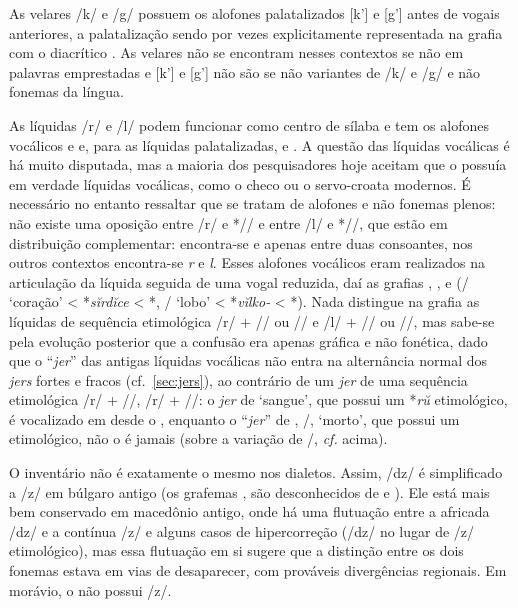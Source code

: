 As velares /k/ e /g/ possuem os alofones palatalizados [k'] e [g'] antes de
vogais anteriores, a palatalização sendo por vezes explicitamente representada na
grafia com o diacrítico .
As velares não se encontram nesses contextos se não em palavras emprestadas e
	[k'] e [g'] não são se não variantes de /k/ e /g/ e não fonemas da língua.

As líquidas /r/ e /l/ podem funcionar como centro de sílaba e tem os alofones
vocálicos  e  e, para as líquidas palatalizadas,
 e .
A questão das líquidas vocálicas é há muito disputada, mas a maioria dos
pesquisadores hoje aceitam que o  possuía em verdade líquidas
vocálicas, como o checo ou o servo-croata modernos.
É necessário no entanto ressaltar que se tratam de alofones e não fonemas plenos:
não existe uma oposição entre /r/ e */\emph{}/ e entre /l/ e
*/\emph{}/, que estão em distribuição complementar: encontra-se
 e  apenas entre duas consoantes, nos outros contextos
encontra-se \emph{r} e \emph{l}.
Esses alofones vocálicos eram realizados na articulação da líquida seguida de
uma vogal reduzida, daí as grafias , ,
 e  (\slash{}
`coração' <  *\emph{sĭrdĭce} < *,
\slash{} `lobo' <  *\emph{vĭlko-}
< *).
Nada distingue na grafia as líquidas de sequência etimológica /r/ +
/\jeru{}/ ou /\jeri{}/ e /l/ + /\jeru{}/ ou /\jeri{}/,
mas sabe-se pela evolução posterior que a confusão era apenas gráfica e não
fonética, dado que o ``\emph{jer}'' das antigas líquidas vocálicas não entra na
alternância normal dos \emph{jers} fortes e fracos (cf.~\ref{sec:jers}), ao
contrário de um \emph{jer} de uma sequência etimológica /r/ + /\jeru{}/,
/r/ + /\jeri{}/:  o \emph{jer} de  `sangue', que possui um
*\emph{rŭ} etimológico, é vocalizado em  desde o
, enquanto o ``\emph{jer}'' de , \slash{},  `morto', que possui um  etimológico,
não o é jamais (sobre a variação de
/, \emph{cf.} acima).

O inventário não é exatamente o mesmo nos dialetos.
Assim, /dz/ é simplificado a /z/ em búlgaro antigo (os grafemas
,  são desconhecidos de 
e ).
Ele está mais bem conservado em macedônio antigo, onde há uma flutuação entre a
africada /dz/ e a contínua /z/ e alguns casos de hipercorreção (/dz/ no lugar de
/z/ etimológico), mas essa flutuação em si sugere que a distinção entre os dois
fonemas estava em vias de desaparecer, com prováveis divergências regionais.
Em  morávio, o  não possui /z/.

